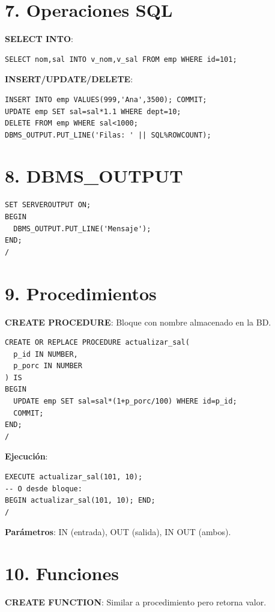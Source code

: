 \documentclass[8pt,a4paper,twocolumn]{article}
\begin{document}
\section*{7. Operaciones SQL}

\textbf{SELECT INTO}:
\begin{lstlisting}
SELECT nom,sal INTO v_nom,v_sal FROM emp WHERE id=101;
\end{lstlisting}

\textbf{INSERT/UPDATE/DELETE}:
\begin{lstlisting}
INSERT INTO emp VALUES(999,'Ana',3500); COMMIT;
UPDATE emp SET sal=sal*1.1 WHERE dept=10;
DELETE FROM emp WHERE sal<1000;
DBMS_OUTPUT.PUT_LINE('Filas: ' || SQL%ROWCOUNT);
\end{lstlisting}

\section*{8. DBMS\_OUTPUT}

\begin{lstlisting}
SET SERVEROUTPUT ON;
BEGIN
  DBMS_OUTPUT.PUT_LINE('Mensaje');
END;
/
\end{lstlisting}

\section*{9. Procedimientos}

\textbf{CREATE PROCEDURE}: Bloque con nombre almacenado en la BD.

\begin{lstlisting}
CREATE OR REPLACE PROCEDURE actualizar_sal(
  p_id IN NUMBER,
  p_porc IN NUMBER
) IS
BEGIN
  UPDATE emp SET sal=sal*(1+p_porc/100) WHERE id=p_id;
  COMMIT;
END;
/
\end{lstlisting}

\textbf{Ejecución}:
\begin{lstlisting}
EXECUTE actualizar_sal(101, 10);
-- O desde bloque:
BEGIN actualizar_sal(101, 10); END;
/
\end{lstlisting}

\textbf{Parámetros}: IN (entrada), OUT (salida), IN OUT (ambos).

\section*{10. Funciones}

\textbf{CREATE FUNCTION}: Similar a procedimiento pero retorna valor.
\end{document}
